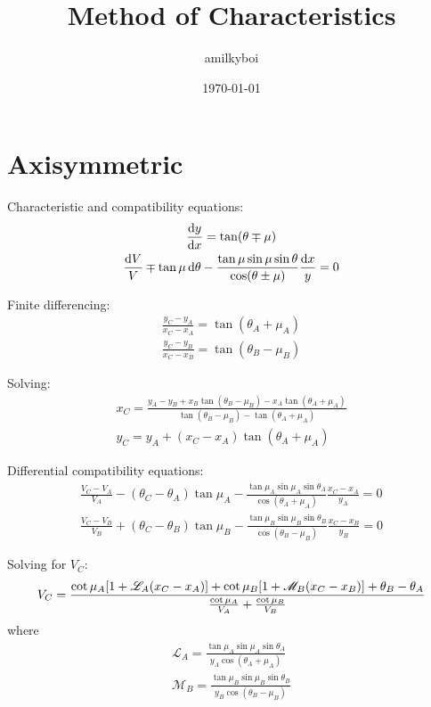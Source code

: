 \documentclass[11pt, fleqn, twoside]{report}
\title{Method of Characteristics}
\author{amilkyboi}
\date{\today}
\DeclarePairedDelimiter\bk{\lbrack}{\rbrack}
\newcommand{\odv}{\dv}
\begin{document}
\maketitle
\tableofcontents
\newpage

\chapter{Axisymmetric}
\label{c:axisymmetric}

Characteristic and compatibility equations:
\begin{gather*}
    \odv{y}{x} = \tan(\theta \mp \mu) \\
    \frac{\dd{V}}{V} \mp \tan{\mu}\dd{\theta} - \frac{\tan{\mu}\sin{\mu}\sin{\theta}}{\cos(\theta \pm \mu)}\frac{\dd{x}}{y} = 0
\end{gather*}

Finite differencing:
\begin{gather*}
    \frac{y_C - y_A}{x_C - x_A} = \tan(\theta_A + \mu_A) \\
    \frac{y_C - y_B}{x_C - x_B} = \tan(\theta_B - \mu_B)
\end{gather*}

Solving:
\begin{gather*}
    x_C = \frac{y_A - y_B + x_B\tan(\theta_B - \mu_B) - x_A\tan(\theta_A + \mu_A)}{\tan(\theta_B - \mu_B) - \tan(\theta_A + \mu_A)} \\
    y_C = y_A + (x_C - x_A)\tan(\theta_A + \mu_A)
\end{gather*}

Differential compatibility equations:
\begin{gather*}
    \frac{V_C - V_A}{V_A} - (\theta_C - \theta_A)\tan{\mu_A} - \frac{\tan{\mu_A}\sin{\mu_A}\sin{\theta_A}}{\cos(\theta_A + \mu_A)}\frac{x_C - x_A}{y_A} = 0 \\
    \frac{V_C - V_B}{V_B} + (\theta_C - \theta_B)\tan{\mu_B} - \frac{\tan{\mu_B}\sin{\mu_B}\sin{\theta_B}}{\cos(\theta_B - \mu_B)}\frac{x_C - x_B}{y_B} = 0
\end{gather*}

Solving for $V_C$:
\begin{equation*}
    V_C = \frac{\cot{\mu_A}\bk*{1 + \mathscr{L}_A(x_C - x_A)} + \cot{\mu_B}\bk*{1 + \mathscr{M}_B(x_C - x_B)} + \theta_B - \theta_A}{\frac{\cot{\mu_A}}{V_A} + \frac{\cot{\mu_B}}{V_B}}
\end{equation*}
where
\begin{gather*}
    \mathscr{L}_A = \frac{\tan{\mu_A}\sin{\mu_A}\sin{\theta_A}}{y_A\cos(\theta_A + \mu_A)} \\
    \mathscr{M}_B = \frac{\tan{\mu_B}\sin{\mu_B}\sin{\theta_B}}{y_B\cos(\theta_B - \mu_B)}
\end{gather*}
\end{document}
